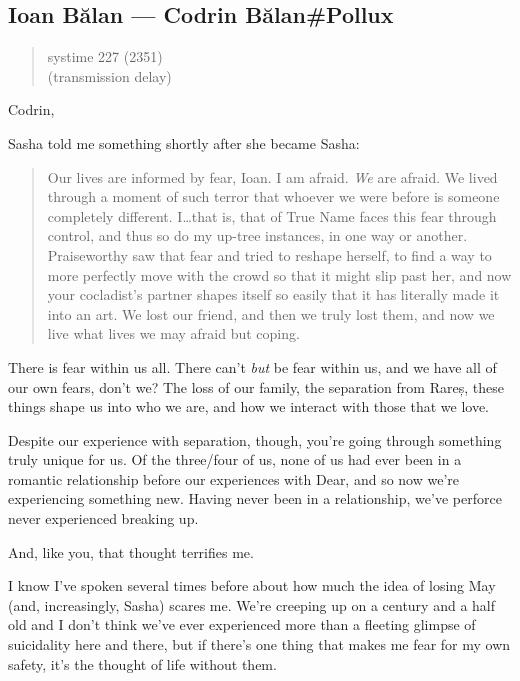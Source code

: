 \hypertarget{ioan-bux103lan-codrin-bux103lanpollux}{%
\subsection{Ioan Bălan — Codrin Bălan\#Pollux}\label{ioan-bux103lan-codrin-bux103lanpollux}}

\begin{quote}
systime 227 (2351)\\
(transmission delay)
\end{quote}

Codrin,

Sasha told me something shortly after she became Sasha:

\begin{quote}
Our lives are informed by fear, Ioan. I am afraid. \emph{We} are afraid. We lived through a moment of such terror that whoever we were before is someone completely different. I\ldots that is, that of True Name faces this fear through control, and thus so do my up-tree instances, in one way or another. Praiseworthy saw that fear and tried to reshape herself, to find a way to more perfectly move with the crowd so that it might slip past her, and now your cocladist's partner shapes itself so easily that it has literally made it into an art. We lost our friend, and then we truly lost them, and now we live what lives we may afraid but coping.
\end{quote}

There is fear within us all. There can't \emph{but} be fear within us, and we have all of our own fears, don't we? The loss of our family, the separation from Rareș, these things shape us into who we are, and how we interact with those that we love.

Despite our experience with separation, though, you're going through something truly unique for us. Of the three/four of us, none of us had ever been in a romantic relationship before our experiences with Dear, and so now we're experiencing something new. Having never been in a relationship, we've perforce never experienced breaking up.

And, like you, that thought terrifies me.

I know I've spoken several times before about how much the idea of losing May (and, increasingly, Sasha) scares me. We're creeping up on a century and a half old and I don't think we've ever experienced more than a fleeting glimpse of suicidality here and there, but if there's one thing that makes me fear for my own safety, it's the thought of life without them.

